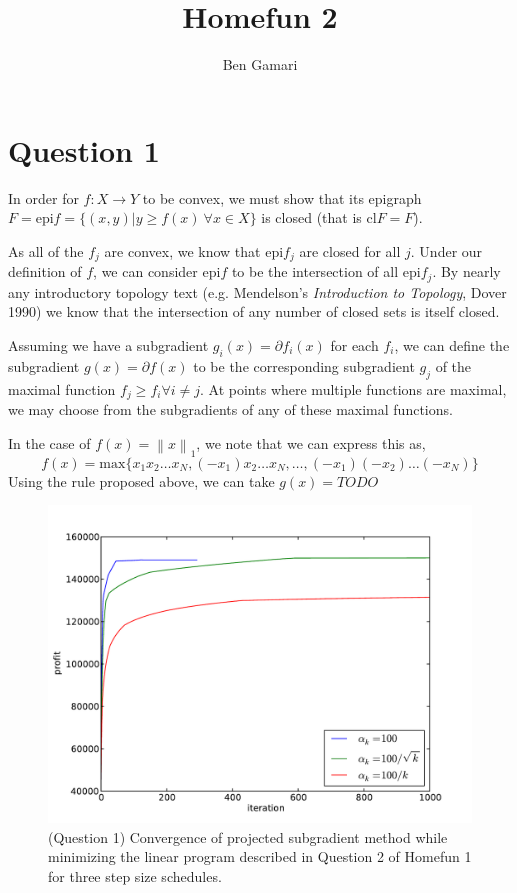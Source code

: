 \documentclass{article}
\title{Homefun 2}
\author{Ben Gamari}
\begin{document}
\maketitle

\newcommand{\norm}[1]{\ensuremath{\left\lVert #1 \right\rVert}}
\newcommand{\twonorm}[1]{\ensuremath{\norm{#1}_2^2}}
\newcommand{\epi}{\ensuremath{\mathrm{epi}}}

\section{Question 1}

In order for $f : X \rightarrow Y$ to be convex, we must show that its
epigraph $F = \epi f = \{ (x,y) \vert y \ge f(x)~\forall x \in X \}$
is closed (that is $\mathrm{cl} F = F$).

As all of the $f_j$ are convex, we know that $\epi f_j$ are
closed for all $j$. Under our definition of $f$, we can consider $\epi
f$ to be the intersection of all $\epi f_j$. By nearly any
introductory topology text (e.g. Mendelson's {\it Introduction to
Topology}, Dover 1990) we know that the intersection of any number of
closed sets is itself closed.

Assuming we have a subgradient $g_i(x) = \partial f_i(x)$ for each
$f_i$, we can define the subgradient $g(x) = \partial f(x)$ to be
the corresponding subgradient $g_j$ of the maximal function $f_j \ge
f_i \forall i \ne j$. At points where multiple functions are maximal,
we may choose from the subgradients of any of these maximal functions.

In the case of $f(x) = \norm{x}_1$, we note that we can express this as,
\[ f(x) = \mathrm{max} \{ x_1 x_2 \ldots x_N, (-x_1) x_2 \ldots x_N, \ldots, (-x_1) (-x_2) \ldots (-x_N) \} \]
Using the rule proposed above, we can take $g(x) = TODO$

\begin{figure}
  \center
  \includegraphics[scale=0.5]{q1-convergence.pdf}
  \caption{(Question 1) Convergence of projected subgradient method
while minimizing the linear program described in Question 2 of Homefun
1 for three step size schedules.}
  \label{Fig:Q1Convergence}
\end{figure}
\end{document}
